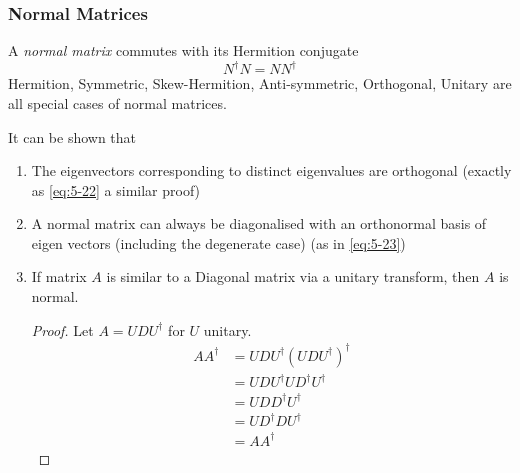\documentclass{article}
\numberwithin{equation}{section}
\begin{document}
\subsubsection{Normal Matrices}
\begin{defi}
    A \emph{normal matrix} commutes with its Hermition conjugate
    \begin{equation}\label{eq:5-26}
        N^\dagger N = N N^\dagger
    \end{equation}
    Hermition, Symmetric, Skew-Hermition, Anti-symmetric, Orthogonal, Unitary are all special cases of normal matrices.
\end{defi}
It can be shown that
\begin{enumerate}
    \item The eigenvectors corresponding to distinct eigenvalues are orthogonal (exactly as \eqref{eq:5-22} a similar proof)
    \item A normal matrix can always be diagonalised with an orthonormal basis of eigen vectors (including the degenerate case) (as in \eqref{eq:5-23})
    \item If matrix $A$ is similar to a Diagonal matrix via a unitary transform, then $A$ is normal.
    \begin{proof}
        Let $A = U D U^\dagger$ for $U$ unitary.
        \begin{align*}
            A A^\dagger &= U D U^\dagger (U D U^\dagger)^\dagger \\
            &= U D U^\dagger U D^\dagger U^\dagger \\
            &= U DD^\dagger U^\dagger \\
            &= U D^\dagger D U^\dagger \\
            &= A A^\dagger
        \end{align*}
    \end{proof}
\end{enumerate}
\end{document}
